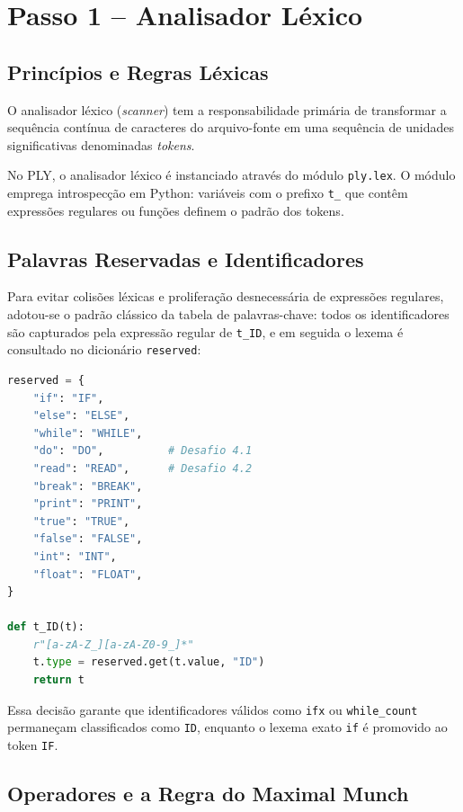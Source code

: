 \documentclass[12pt,a4paper]{article}
\begin{document}
\section{Passo 1 -- Analisador Léxico}

\subsection{Princípios e Regras Léxicas}

O analisador léxico (\textit{scanner}) tem a responsabilidade primária de transformar
a sequência contínua de caracteres do arquivo-fonte em uma sequência de unidades
significativas denominadas \textit{tokens}.

No PLY, o analisador léxico é instanciado através do módulo \texttt{ply.lex}. O
módulo emprega introspecção em Python: variáveis com o prefixo \texttt{t\_} que
contêm expressões regulares ou funções definem o padrão dos tokens.

\subsection{Palavras Reservadas e Identificadores}

Para evitar colisões léxicas e proliferação desnecessária de expressões regulares,
adotou-se o padrão clássico da tabela de palavras-chave: todos os identificadores
são capturados pela expressão regular de \texttt{t\_ID}, e em seguida o lexema é
consultado no dicionário \texttt{reserved}:

\begin{lstlisting}[language=Python]
reserved = {
    "if": "IF",
    "else": "ELSE",
    "while": "WHILE",
    "do": "DO",          # Desafio 4.1
    "read": "READ",      # Desafio 4.2
    "break": "BREAK",
    "print": "PRINT",
    "true": "TRUE",
    "false": "FALSE",
    "int": "INT",
    "float": "FLOAT",
}

def t_ID(t):
    r"[a-zA-Z_][a-zA-Z0-9_]*"
    t.type = reserved.get(t.value, "ID")
    return t
\end{lstlisting}

Essa decisão garante que identificadores válidos como \texttt{ifx} ou \texttt{while\_count}
permaneçam classificados como \texttt{ID}, enquanto o lexema exato \texttt{if} é promovido
ao token \texttt{IF}.

\subsection{Operadores e a Regra do Maximal Munch}
\end{document}
